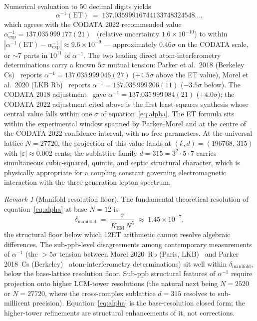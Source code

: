 \documentclass[11pt,a4paper]{article}
\theoremstyle{definition}
\theoremstyle{remark}
\newtheorem{remark}[theorem]{Remark}
\newcommand{\eps}{\varepsilon}
\begin{document}
Numerical evaluation to $50$ decimal digits yields
\[
\alpha^{-1}(\mathrm{ET}) \;=\; 137.03599916744133748324548\ldots,
\]
which agrees with the CODATA 2022 recommended value $\alpha^{-1}_{\mathrm{exp}} = 137.035\,999\,177(21)$~\cite{CODATA2022} (relative uncertainty $1.6\times 10^{-10}$) to within $|\alpha^{-1}(\mathrm{ET}) - \alpha^{-1}_{\mathrm{exp}}| \approx 9.6\times 10^{-9}$ --- approximately $0.46\sigma$ on the CODATA scale, or $\sim 7$ parts in $10^{11}$ of $\alpha^{-1}$. The two leading direct atom-interferometry determinations carry a known $5\sigma$ mutual tension: Parker et al.~2018 (Berkeley Cs)~\cite{Parker2018} reports $\alpha^{-1} = 137.035\,999\,046(27)$ ($+4.5\sigma$ above the ET value), Morel et al.~2020 (LKB Rb)~\cite{Morel2020} reports $\alpha^{-1} = 137.035\,999\,206(11)$ ($-3.5\sigma$ below). The CODATA 2018 adjustment~\cite{CODATA2018} gave $\alpha^{-1} = 137.035\,999\,084(21)$ ($+4.0\sigma$); the CODATA 2022 adjustment cited above is the first least-squares synthesis whose central value falls within one $\sigma$ of equation~\eqref{eq:alpha}. The ET formula sits within the experimental window spanned by Parker--Morel and at the centre of the CODATA 2022 confidence interval, with no free parameters. At the universal lattice $N=27720$, the projection of this value lands at $(k,d)=(196768,\,315)$ with $|\eps|\approx 0.002$ cents; the sublattice family $d=315 = 3^{2}\cdot 5\cdot 7$ carries simultaneous cubic-squared, quintic, and septic structural character, which is physically appropriate for a coupling constant governing electromagnetic interaction with the three-generation lepton spectrum.

\begin{remark}[Manifold resolution floor]\label{rem:alpha-resolution-floor}
The fundamental theoretical resolution of equation~\eqref{eq:alpha} at base $N=12$ is
\[
\delta_{\mathrm{manifold}} \;=\; \frac{\sigma}{K_{\mathrm{EM}}\,N^{5}} \;\approx\; 1.45\times 10^{-7},
\]
the structural floor below which 12ET arithmetic cannot resolve algebraic differences. The sub-ppb-level disagreements among contemporary measurements of $\alpha^{-1}$ (the $>5\sigma$ tension between Morel 2020~Rb (Paris, LKB)~\cite{Morel2020} and Parker 2018~Cs (Berkeley)~\cite{Parker2018} atom-interferometry determinations) sit well within $\delta_{\mathrm{manifold}}$, below the base-lattice resolution floor. Sub-ppb structural features of $\alpha^{-1}$ require projection onto higher LCM-tower resolutions (the natural next being $N=2520$ or $N=27720$, where the cross-complex sublattice $d=315$ resolves to sub-millicent precision). Equation~\eqref{eq:alpha} is the base-resolution closed form; the higher-tower refinements are structural enhancements of it, not corrections.
\end{remark}
\end{document}
